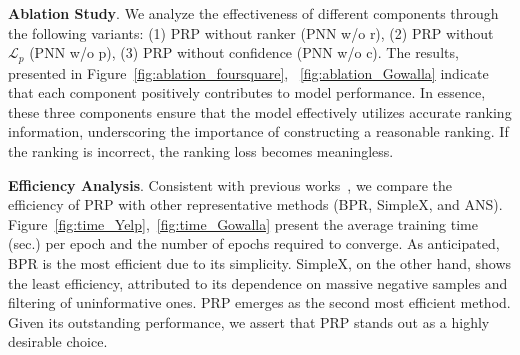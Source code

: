 \textbf{Ablation Study}. We analyze the effectiveness of different components through the following variants: (1) PRP without ranker (PNN w/o r), (2) PRP without $\mathcal{L}_p$ (PNN w/o p), (3) PRP without confidence (PNN w/o c). The results, presented in Figure~\ref{fig:ablation_foursquare}, ~\ref{fig:ablation_Gowalla} indicate that each component positively contributes to model performance. In essence, these three components ensure that the model effectively utilizes accurate ranking information, underscoring the importance of constructing a reasonable ranking. If the ranking is incorrect, the ranking loss becomes meaningless.

\textbf{Efficiency Analysis}. Consistent with previous works~\cite{MZW21, WYM22, ZCL23}, we compare the efficiency of PRP with other representative methods (BPR, SimpleX, and ANS). Figure~\ref{fig:time_Yelp},~\ref{fig:time_Gowalla} present the average training time (sec.) per epoch and the number of epochs required to converge. As anticipated, BPR is the most efficient due to its simplicity. SimpleX, on the other hand, shows the least efficiency, attributed to its dependence on massive negative samples and filtering of uninformative ones. PRP emerges as the second most efficient method. Given its outstanding performance, we assert that PRP stands out as a highly desirable choice.
